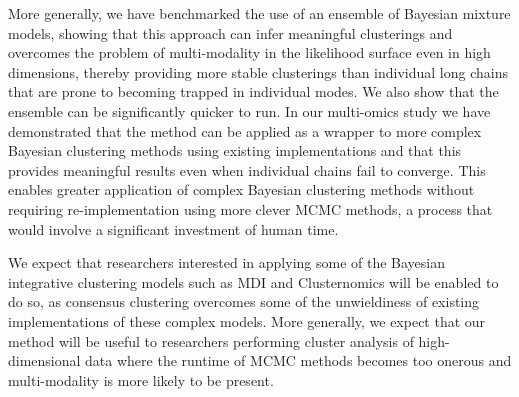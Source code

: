 \documentclass{bmcart}
\begin{document}
	More generally, we have benchmarked the use of an ensemble of Bayesian mixture models, showing that this approach can infer meaningful clusterings and overcomes the problem of multi-modality in the likelihood surface even in high dimensions, thereby providing more stable clusterings than individual long chains that are prone to becoming trapped in individual modes. We also show that the ensemble can be significantly quicker to run. In our multi-omics study we have demonstrated that the method can be applied as a wrapper to more complex Bayesian clustering methods using existing implementations and that this provides meaningful results even when individual chains fail to converge. This enables greater application of complex Bayesian clustering methods without requiring re-implementation using more clever MCMC methods, a process that would involve a significant investment of human time.
	
	We expect that researchers interested in applying some of the Bayesian integrative clustering models such as MDI and Clusternomics \citep{gabasova2017clusternomics} will be enabled to do so, as consensus clustering overcomes some of the unwieldiness of existing implementations of these complex models. More generally, we expect that our method will be useful to researchers performing cluster analysis of high-dimensional data where the runtime of MCMC methods becomes too onerous and multi-modality is more likely to be present.
	
\end{document}
